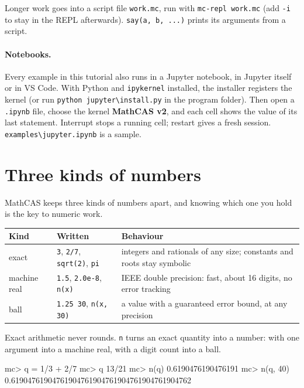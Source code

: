 \documentclass[11pt,a4paper]{article}
\newcommand{\code}[1]{\texttt{#1}}
\begin{document}
\noindent Longer work goes into a script file \code{work.mc}, run with \code{mc-repl work.mc} (add \code{-i}
to stay in the REPL afterwards). \code{say(a, b, ...)} prints its arguments from a script.

\paragraph{Notebooks.} Every example in this tutorial also runs in a Jupyter notebook, in Jupyter itself or in
VS Code. With Python and \code{ipykernel} installed, the installer registers the kernel (or run
\code{python jupyter\textbackslash install.py} in the program folder). Then open a \code{.ipynb} file, choose the
kernel \textbf{MathCAS v2}, and each cell shows the value of its last statement. Interrupt stops a running cell;
restart gives a fresh session. \code{examples\textbackslash jupyter.ipynb} is a sample.

\section{Three kinds of numbers}

MathCAS keeps three kinds of numbers apart, and knowing which one you hold is the key to numeric work.

\begin{center}
\begin{tabularx}{\linewidth}{@{}llX@{}}
\toprule
\textbf{Kind} & \textbf{Written} & \textbf{Behaviour} \\
\midrule
exact & \code{3}, \code{2/7}, \code{sqrt(2)}, \code{pi} & integers and rationals of any size; constants and roots stay symbolic \\
machine real & \code{1.5}, \code{2.0e-8}, \code{n(x)} & IEEE double precision: fast, about 16 digits, no error tracking \\
ball & \code{1.25\char126 30}, \code{n(x, 30)} & a value with a guaranteed error bound, at any precision \\
\bottomrule
\end{tabularx}
\end{center}

\noindent Exact arithmetic never rounds. \code{n} turns an exact quantity into a number: with one argument
into a machine real, with a digit count into a ball.

\begin{repl}
mc> q = 1/3 + 2/7
mc> q
13/21
mc> n(q)
0.6190476190476191
mc> n(q, 40)
0.61904761904761904761904761904761904761904762
\end{repl}
\end{document}
